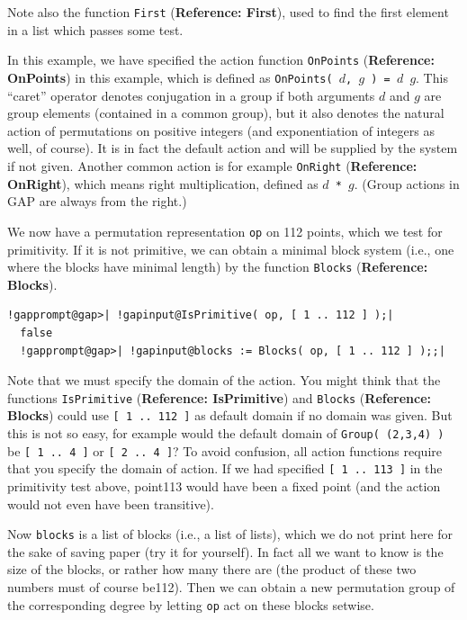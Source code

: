 \documentclass[a4paper,11pt]{report}
\begin{document}
{{ Note also the function \texttt{First} (\textbf{Reference: First}), used to find the first element in a list which passes some test. 

 In this example, we have specified the action function \texttt{OnPoints} (\textbf{Reference: OnPoints}) in this example, which is defined as \texttt{OnPoints( }$d$\texttt{, }$g$\texttt{ ) = }$d$\texttt{ \texttt{} }$g$. This ``caret'' operator denotes conjugation in a group if both arguments $d$ and $g$ are group elements (contained in a common group), but it also denotes the
natural action of permutations on positive integers (and exponentiation of
integers as well, of course). It is in fact the default action and will be
supplied by the system if not given. Another common action is for example \texttt{OnRight} (\textbf{Reference: OnRight}), which means right multiplication, defined as $d$\texttt{ * }$g$. (Group actions in \textsf{GAP} are always from the right.) 

 We now have a permutation representation \texttt{op} on 112 points, which we test for primitivity. If it is not primitive, we can
obtain a minimal block system (i.e., one where the blocks have minimal length)
by the function \texttt{Blocks} (\textbf{Reference: Blocks}). 

 
\begin{Verbatim}[commandchars=!@|,fontsize=\small,frame=single,label=Example]
  !gapprompt@gap>| !gapinput@IsPrimitive( op, [ 1 .. 112 ] );|
  false
  !gapprompt@gap>| !gapinput@blocks := Blocks( op, [ 1 .. 112 ] );;|
\end{Verbatim}
 

 Note that we must specify the domain of the action. You might think that the
functions \texttt{IsPrimitive} (\textbf{Reference: IsPrimitive}) and \texttt{Blocks} (\textbf{Reference: Blocks}) could use \texttt{[ 1 .. 112 ]} as default domain if no domain was given. But this is not so easy, for example
would the default domain of \texttt{Group( (2,3,4) )} be \texttt{[ 1 .. 4 ]} or \texttt{[ 2 .. 4 ]}? To avoid confusion, all action functions require that you specify the domain
of action. If we had specified \texttt{[ 1 .. 113 ]} in the primitivity test above, point{\nobreakspace}113 would have been a fixed
point (and the action would not even have been transitive). 

 Now \texttt{blocks} is a list of blocks (i.e., a list of lists), which we do not print here for
the sake of saving paper (try it for yourself). In fact all we want to know is
the size of the blocks, or rather how many there are (the product of these two
numbers must of course be{\nobreakspace}112). Then we can obtain a new
permutation group of the corresponding degree by letting \texttt{op} act on these blocks setwise. 

}}
\end{document}
